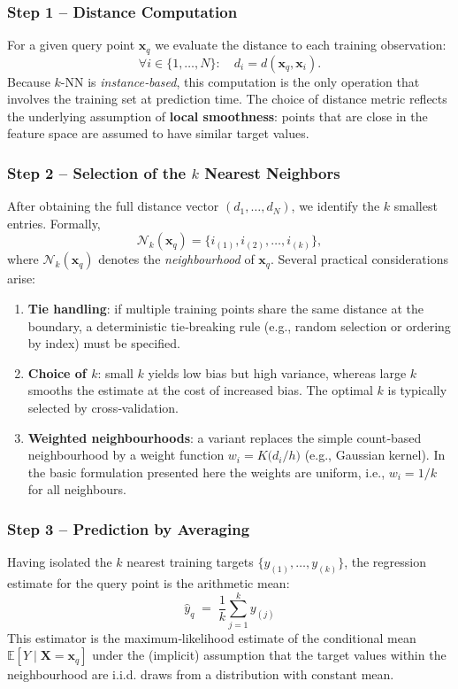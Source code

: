 \documentclass[12pt, a4paper]{article}
\begin{document}
\subsubsection{Step 1 – Distance Computation}
For a given query point \(\mathbf{x}_q\) we evaluate the distance to each training observation:
\[
\forall i\in\{1,\dots,N\}:\quad
d_i = d(\mathbf{x}_q,\mathbf{x}_i).
\]
Because \(k\)-NN is \emph{instance‑based}, this computation is the only operation that involves the training set at prediction time.  The choice of distance metric reflects the underlying assumption of \textbf{local smoothness}: points that are close in the feature space are assumed to have similar target values.

\subsubsection{Step 2 – Selection of the \(k\) Nearest Neighbors}
After obtaining the full distance vector \((d_1,\dots,d_N)\), we identify the \(k\) smallest entries.  Formally,
\[
\mathcal{N}_k(\mathbf{x}_q)=\{i_{(1)}, i_{(2)},\dots,i_{(k)}\},
\]
where \(\mathcal{N}_k(\mathbf{x}_q)\) denotes the \emph{neighbourhood} of \(\mathbf{x}_q\).  Several practical considerations arise:

\begin{enumerate}
    \item \textbf{Tie handling}: if multiple training points share the same distance at the boundary, a deterministic tie‑breaking rule (e.g., random selection or ordering by index) must be specified.
    \item \textbf{Choice of \(k\)}: small \(k\) yields low bias but high variance, whereas large \(k\) smooths the estimate at the cost of increased bias.  The optimal \(k\) is typically selected by cross‑validation.
    \item \textbf{Weighted neighbourhoods}: a variant replaces the simple count‑based neighbourhood by a weight function \(w_i = K\big(d_i/h\big)\) (e.g., Gaussian kernel).  In the basic formulation presented here the weights are uniform, i.e., \(w_i=1/k\) for all neighbours.
\end{enumerate}

\subsubsection{Step 3 – Prediction by Averaging}
Having isolated the \(k\) nearest training targets \(\{y_{(1)},\dots,y_{(k)}\}\), the regression estimate for the query point is the arithmetic mean:
\[
\boxed{\;
\hat{y}_q \;=\; \frac{1}{k}\sum_{j=1}^{k} y_{(j)}
\;}
\]
This estimator is the maximum‑likelihood estimate of the conditional mean \(\mathbb{E}[Y\mid \mathbf{X}=\mathbf{x}_q]\) under the (implicit) assumption that the target values within the neighbourhood are i.i.d. draws from a distribution with constant mean.
\end{document}
